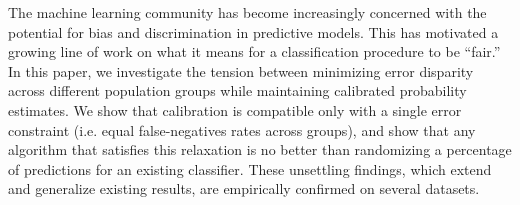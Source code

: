 The machine learning community has become increasingly concerned with the
potential for bias and discrimination in predictive models.
This has motivated a growing line of work on what it means for a classification procedure
to be ``fair.''
In this paper, we investigate the tension between minimizing error
disparity across different population groups while maintaining calibrated probability
estimates.
We show that calibration is compatible only with a single error
constraint (i.e. equal false-negatives rates across groups),
and show that any algorithm that satisfies this relaxation is no
better than randomizing a percentage of predictions for an existing classifier.
These unsettling findings, which extend and generalize existing results,
are empirically confirmed on several datasets.
